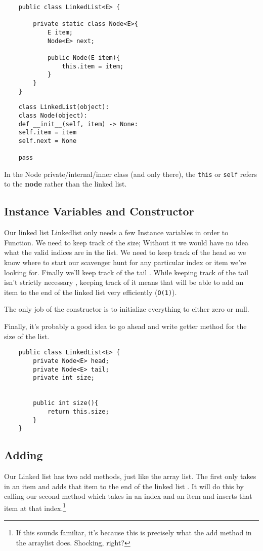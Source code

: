 \begin{verbatim}
	public class LinkedList<E> { 
		
		private static class Node<E>{
			E item;
			Node<E> next;
			
			public Node(E item){
				this.item = item;
			}
		}
	}
\end{verbatim}

\begin{verbatim}
	class LinkedList(object):
	class Node(object):
	def __init__(self, item) -> None:
	self.item = item
	self.next = None
	
	pass
\end{verbatim}

In the Node private/internal/inner class (and only there), the \texttt{this} or \texttt{self} refers to the \textbf{node} rather than the linked list.





\subsection{Instance Variables and Constructor}

Our linked list Linkedlist only needs a few Instance  variables in order to Function. We need to keep track of the size; Without it we would have no idea what the valid indices are in the list. We need to keep track of the head so we know where to start our scavenger hunt for any particular index or item we're looking for.  Finally we'll keep track of the tail . While keeping track of the tail isn't strictly necessary , keeping track of it means that will be able to add an item to the end of the linked list very efficiently (\texttt{O(1)}).

The only job of the constructor is to initialize everything to either zero or null.

Finally, it's probably a good idea to go ahead and write getter method for the size of the list.

\begin{verbatim}
	public class LinkedList<E> { 
		private Node<E> head;
		private Node<E> tail;
		private int size;
		
		
		public int size(){
			return this.size;
		}
	}
\end{verbatim}






\subsection{Adding}
Our Linked list has two add methods, just like the array list.  The first only takes in an item and adds that item to the end of the linked list . It will do this by calling our second method which takes in an index and an item and inserts that item at that index.\footnote{If this sounds familiar, it's because this is precisely what the add method in the arraylist does. Shocking, right?}

